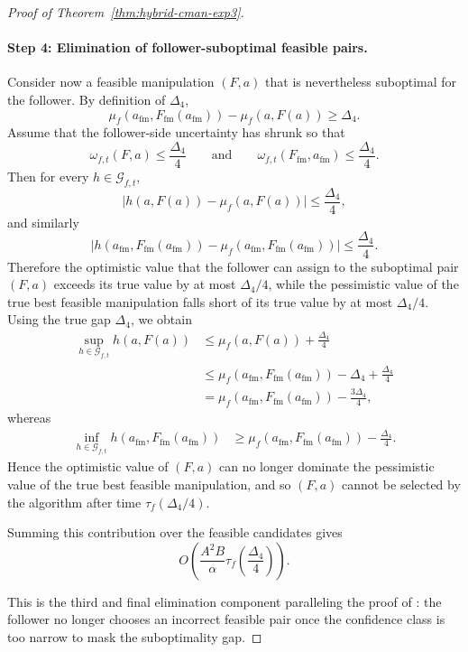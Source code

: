 \documentclass{article}
\begin{document}
\begin{proof}[Proof of Theorem~\ref{thm:hybrid-cman-exp3}]
\paragraph{Step 4: Elimination of follower-suboptimal feasible pairs.}
Consider now a feasible manipulation $(F,a)$ that is nevertheless
suboptimal for the follower. By definition of $\Delta_4$,
\[
\mu_f(a_{\mathrm{fm}},F_{\mathrm{fm}}(a_{\mathrm{fm}}))
-
\mu_f(a,F(a))
\ge
\Delta_4.
\]
Assume that the follower-side uncertainty has shrunk so that
\[
\omega_{f,t}(F,a)\le \frac{\Delta_4}{4}
\qquad\text{and}\qquad
\omega_{f,t}(F_{\mathrm{fm}},a_{\mathrm{fm}})\le \frac{\Delta_4}{4}.
\]
Then for every $h\in\mathcal G_{f,t}$,
\[
\bigl|
h(a,F(a))-\mu_f(a,F(a))
\bigr|
\le
\frac{\Delta_4}{4},
\]
and similarly
\[
\bigl|
h(a_{\mathrm{fm}},F_{\mathrm{fm}}(a_{\mathrm{fm}}))
-
\mu_f(a_{\mathrm{fm}},F_{\mathrm{fm}}(a_{\mathrm{fm}}))
\bigr|
\le
\frac{\Delta_4}{4}.
\]
Therefore the optimistic value that the follower can assign to the
suboptimal pair $(F,a)$ exceeds its true value by at most
$\Delta_4/4$, while the pessimistic value of the true best feasible
manipulation falls short of its true value by at most $\Delta_4/4$.
Using the true gap $\Delta_4$, we obtain
\begin{align*}
\sup_{h\in\mathcal G_{f,t}} h(a,F(a))
&\le
\mu_f(a,F(a))+\frac{\Delta_4}{4} \\
&\le
\mu_f(a_{\mathrm{fm}},F_{\mathrm{fm}}(a_{\mathrm{fm}}))
-\Delta_4+\frac{\Delta_4}{4} \\
&=
\mu_f(a_{\mathrm{fm}},F_{\mathrm{fm}}(a_{\mathrm{fm}}))
-\frac{3\Delta_4}{4},
\end{align*}
whereas
\begin{align*}
\inf_{h\in\mathcal G_{f,t}}
h(a_{\mathrm{fm}},F_{\mathrm{fm}}(a_{\mathrm{fm}}))
&\ge
\mu_f(a_{\mathrm{fm}},F_{\mathrm{fm}}(a_{\mathrm{fm}}))
-\frac{\Delta_4}{4}.
\end{align*}
Hence the optimistic value of $(F,a)$ can no longer dominate the
pessimistic value of the true best feasible manipulation, and so
$(F,a)$ cannot be selected by the algorithm after time
$\tau_f(\Delta_4/4)$.

Summing this contribution over the feasible candidates gives
\[
O\!\left(
\frac{A^2B}{\alpha}\tau_f\!\left(\frac{\Delta_4}{4}\right)
\right).
\]

This is the third and final elimination component paralleling the
proof of \cite{yu2024decentralized}: the follower no longer chooses an
incorrect feasible pair once the confidence class is too narrow to
mask the suboptimality gap.


\end{proof}
\end{document}
